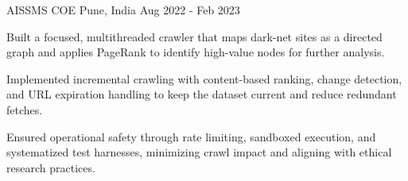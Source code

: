 

\begin{cventries}

  \cventry
    {AISSMS COE} %
    {} %
    {Pune, India} %
    {Aug 2022 - Feb 2023} %
    {
      \begin{cvitems} %
        \item {}
        \item {Built a focused, multithreaded crawler that maps dark-net sites as a directed graph and applies PageRank to identify high-value nodes for further analysis.}
        \item {Implemented incremental crawling with content-based ranking, change detection, and URL expiration handling to keep the dataset current and reduce redundant fetches.}
        \item {Ensured operational safety through rate limiting, sandboxed execution, and systematized test harnesses, minimizing crawl impact and aligning with ethical research practices.}
      \end{cvitems}
    }



\end{cventries}
